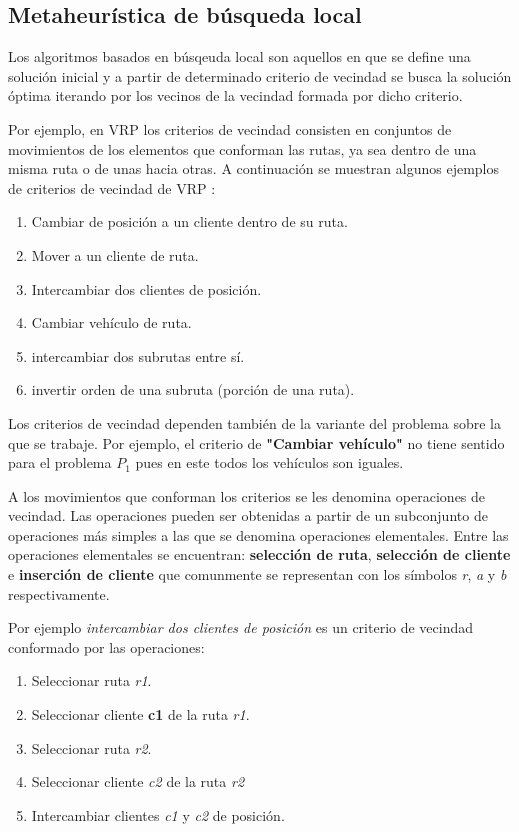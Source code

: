 \subsection{Metaheurística de búsqueda local}\label{2-Local}
Los algoritmos basados en búsqeuda local son aquellos en que se define una solución inicial y a partir de determinado criterio de vecindad se busca la solución óptima iterando por los vecinos de la vecindad formada por dicho criterio. 

Por ejemplo, en VRP los criterios de vecindad consisten en conjuntos de movimientos de los elementos que conforman las rutas, ya sea dentro de una misma ruta o de unas hacia otras. A continuación se muestran algunos ejemplos de criterios de vecindad de VRP \cite{TODO}:

\begin{enumerate}
	\item Cambiar de posición a un cliente dentro de su ruta.
	\item Mover a un cliente de ruta.
	\item Intercambiar dos clientes de posición.
	\item Cambiar vehículo de ruta.
	\item intercambiar dos subrutas entre sí.
	\item invertir orden de una subruta (porción de una ruta).
\end{enumerate}

Los criterios de vecindad dependen también de la variante del problema sobre la que se trabaje. Por ejemplo, el criterio de \textbf{"Cambiar vehículo"} no tiene sentido para el problema $P_1$ pues en este todos los vehículos son iguales.

A los movimientos que conforman los criterios se les denomina operaciones de vecindad. Las operaciones pueden ser obtenidas a partir de un subconjunto de operaciones más simples a las que se denomina operaciones elementales. Entre las operaciones elementales se encuentran: \textbf{selección de ruta}, \textbf{selección de cliente} e \textbf{inserción de cliente} que comunmente se representan con los símbolos \textit{r}, \textit{a} y \textit{b} respectivamente. 

Por ejemplo \textit{intercambiar dos clientes de posición} es un criterio de vecindad conformado por las operaciones:

\begin{enumerate}
	\item Seleccionar ruta \textit{r1}.
	\item Seleccionar cliente \textbf{c1} de la ruta \textit{r1}.
	\item Seleccionar ruta \textit{r2}.
	\item Seleccionar cliente \textit{c2} de la ruta \textit{r2}
	\item Intercambiar clientes \textit{c1} y \textit{c2} de posición.
\end{enumerate}

